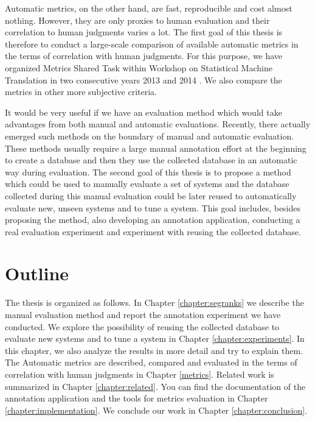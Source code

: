 Automatic metrics, on the other hand, are fast, reproducible and cost almost
nothing. However, they are only proxies to human evaluation and their
correlation to human judgments varies a lot. The first goal of this thesis is
therefore to conduct a large-scale comparison of available automatic metrics in
the terms of correlation with human judgments. For this purpose, we have
organized Metrics Shared Task within Workshop on Statistical Machine
Translation in two consecutive years 2013  and 2014
. We also compare the metrics in other more subjective
criteria. 

It would be very useful if we have an evaluation method which would take
advantages from both manual and automatic evaluations. Recently, there actually
emerged such methods on the boundary of manual and automatic evaluation. These
methods usually require a large manual annotation effort at the beginning to
create a database and then they use the collected database in an automatic way
during evaluation.  The second goal of this thesis is to propose a method which
could be used to manually evaluate a set of systems and the database collected
during this manual evaluation could be later reused to automatically evaluate
new, unseen systems and to tune a system. This goal includes, besides proposing
the method, also developing an annotation application, conducting a real
evaluation experiment and experiment with reusing the collected database. 

\section{Outline}

The thesis is organized as follows. In Chapter \ref{chapter:segranks} we
describe the manual evaluation method and report the annotation experiment we
have conducted. We explore the possibility of reusing the collected database to
evaluate new systems and to tune a system in Chapter \ref{chapter:experiments}.
In this chapter, we also analyze the results in more detail and try to explain
them.  The Automatic metrics are described, compared and evaluated in the
terms of correlation with human judgments in Chapter \ref{metrics}. Related
work is summarized in Chapter \ref{chapter:related}. You can find the
documentation of the annotation application and the tools for metrics
evaluation in Chapter \ref{chapter:implementation}. We conclude our work in
Chapter \ref{chapter:conclusion}.





